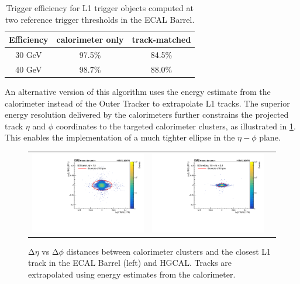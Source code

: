 \begin{table}[th]
\sffamily
\centering
\caption{Trigger efficiency for \ac{L1} trigger objects computed at two reference trigger thresholds in the \ac{ECAL} Barrel. }
\begin{tabular}{ccc} \toprule
Efficiency & calorimeter only & track-matched \\  \midrule
 30 GeV   & 97.5\%   & 84.5\%\\ \midrule
 40 GeV & 98.7\%   & 88.0\%\\ \bottomrule
\end{tabular}
\label{tab:L1EleEff}
\end{table}

An alternative version of this algorithm uses the energy estimate from the calorimeter instead of the Outer Tracker to extrapolate \ac{L1} tracks. The superior energy resolution delivered by the calorimeters further constrains the projected track $\eta$ and $\phi$ coordinates to the targeted calorimeter clusters, as illustrated in \ref{fig:DR_electron}. This enables the implementation of a much tighter ellipse in the $\eta-\phi$ plane.

\begin{figure}[tbh!]
 \begin{center}
 \begin{tabular}{ccc}
  \includegraphics[width=.45\linewidth]{figures/Part2/Upgrade/DR_barrel_new}&
  \includegraphics[width=.45\linewidth]{figures/Part2/Upgrade/DR_endcap_new}&
 \end{tabular}
 \caption{$\mathrm{\Delta}\eta$ vs $\mathrm{\Delta}\phi$ distances between calorimeter clusters and the closest \ac{L1} track in the \ac{ECAL} Barrel (left) and \ac{HGCAL}. Tracks are extrapolated using energy estimates from the calorimeter.}
 \label{fig:DR_electron}
 \end{center}
\end{figure}

